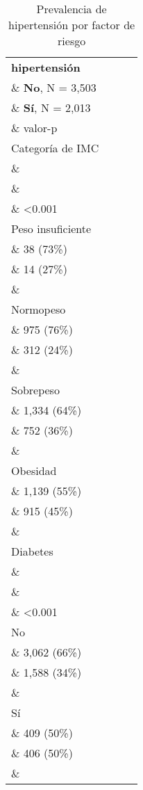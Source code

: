 \documentclass{aa}
\begin{document}
\begin{table}[]
\caption{\small Prevalencia de hipertensión por factor de riesgo}
    \centering
    \tiny

\captionsetup[table]{labelformat=empty,skip=1pt}
\begin{tabular}{lccc}
\toprule
\textbf{hipertensión} \\\& \textbf{No}, N = 3,503 \\\& \textbf{Sí}, N = 2,013 \\\& valor-p \\ 
\midrule
Categoría de IMC \\\&  \\\&  \\\& <0.001 \\ 
\-\hspace{5mm} \tiny Peso insuficiente \\\& 38 (73\%) \\\& 14 (27\%) \\\&  \\ 
\-\hspace{5mm} \tiny Normopeso \\\& 975 (76\%) \\\& 312 (24\%) \\\&  \\ 
\-\hspace{5mm} \tiny Sobrepeso \\\& 1,334 (64\%) \\\& 752 (36\%) \\\&  \\ 
\-\hspace{5mm} \tiny Obesidad \\\& 1,139 (55\%) \\\& 915 (45\%) \\\&  \\ 
Diabetes \\\&  \\\&  \\\& <0.001 \\ 
\-\hspace{5mm} \tiny No \\\& 3,062 (66\%) \\\& 1,588 (34\%) \\\&  \\ 
\-\hspace{5mm} \tiny Sí \\\& 409 (50\%) \\\& 406 (50\%) \\\&  \\ 

\end{tabular}
\end{table}
\end{document}
